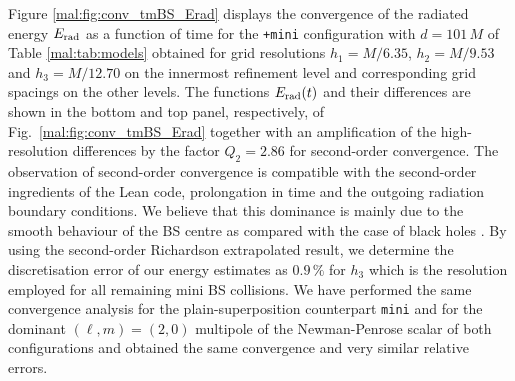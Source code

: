 Figure \ref{mal:fig:conv_tmBS_Erad} displays the convergence
of the radiated energy $E_{\rm rad}$ as a function
of time for the {\tt +mini} configuration with $d=101\,M$ of
Table \ref{mal:tab:models} obtained for grid resolutions
$h_1=M/6.35$, $h_2=M/9.53$ and $h_3=M/12.70$ on the
innermost refinement level and corresponding grid 
spacings on the other levels. The functions
$E_{\rm rad}(t)$ and their differences are shown in the
bottom and top panel, respectively, of Fig.~\ref{mal:fig:conv_tmBS_Erad}
together with an amplification of the high-resolution
differences by the factor $Q_2=2.86$ for second-order
convergence. The observation of second-order convergence
is compatible with the second-order ingredients of the
{\sc Lean} code, prolongation in time and the outgoing
radiation boundary conditions. We believe that this
dominance is mainly due to the smooth behaviour
of the BS centre as compared with the case of black holes
\cite{Husa:2007hp}. By using the second-order
Richardson extrapolated result, we determine the
discretisation error of our energy estimates as
$0.9\,\%$ for $h_3$ which is the resolution employed
for all remaining mini BS collisions. We have performed
the same convergence analysis for the plain-superposition
counterpart {\tt mini} and for the dominant $(\ell,m)=(2,0)$
multipole of the Newman-Penrose scalar of both configurations
and obtained the same convergence and very similar relative
errors.
%
%

